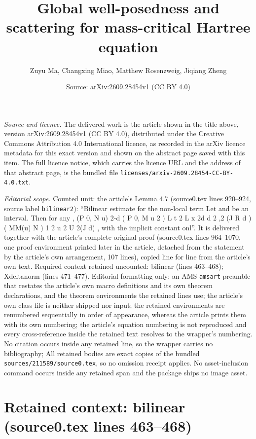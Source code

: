 \documentclass[10pt,a4paper]{amsart}
\title[Global well-posedness and scattering for mass-critical Hartree equation]{Global well-posedness and scattering for mass-critical Hartree equation}
\author{Zuyu Ma, Changxing Miao, Matthew Rosenzweig, Jiqiang Zheng}
\date{Source: arXiv:2609.28454v1 (CC BY 4.0)}
\theoremstyle{plain}
\theoremstyle{definition}
\begin{document}
\maketitle

\noindent\emph{Source and licence.} The delivered work is the article shown in the title above, version arXiv:2609.28454v1 (CC BY 4.0), distributed under the Creative Commons Attribution 4.0 International licence, as recorded in the arXiv licence metadata for this exact version and shown on the abstract page saved with this item. The full licence notice, which carries the licence URL and the address of that abstract page, is the bundled file \texttt{licenses/arxiv-2609.28454-CC-BY-4.0.txt}.
\par\smallskip

\noindent\textit{Editorial scope.} Counted unit: the article's Lemma 4.7 (source0.tex lines 920--924, source label \texttt{bilinear2}): ``Bilinear estimate for the non-local term Let and be an interval. Then for any , (P 0, N u) 2-d ( P 0, M u 2 ) L t 2 L x 2d d 2 ,2 (J R d ) ( MM(u) N ) 1 2 u 2 U 2(J d) , with the implicit constant onl''. It is delivered together with the article's complete original proof (source0.tex lines 964--1070, one proof environment printed later in the article, detached from the statement by the article's own arrangement, 107 lines), copied line for line from the article's own text. Required context retained uncounted: bilinear (lines 463--468); Xdeltanorm (lines 471--477). Editorial formatting only: an AMS \texttt{amsart} preamble that restates the article's own macro definitions and its own theorem declarations, and the theorem environments the retained lines use; the article's own class file is neither shipped nor input; the retained environments are renumbered sequentially in order of appearance, whereas the article prints them with its own numbering; the article's equation numbering is not reproduced and every cross-reference inside the retained text resolves to the wrapper's numbering. No citation occurs inside any retained line, so the wrapper carries no bibliography; All retained bodies are exact copies of the bundled \texttt{sources/211589/source0.tex}, so no omission receipt applies. No asset-inclusion command occurs inside any retained span and the package ships no image asset.


\section*{Retained context: bilinear (source0.tex lines 463--468)}
\end{document}
